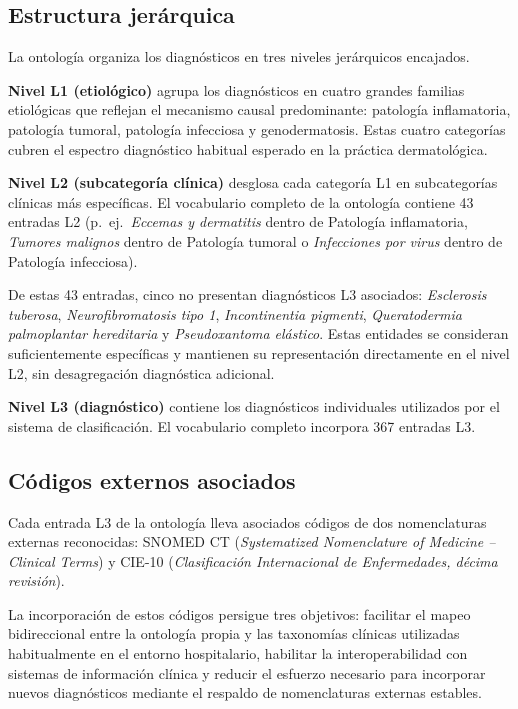 \subsection{Estructura jerárquica}
\label{sec:ontologia-estructura}

La ontología organiza los diagnósticos en tres niveles jerárquicos
encajados.

\textbf{Nivel L1 (etiológico)} agrupa los diagnósticos en cuatro
grandes familias etiológicas que reflejan el mecanismo causal
predominante: patología inflamatoria, patología tumoral, patología
infecciosa y genodermatosis. Estas cuatro categorías cubren el
espectro diagnóstico habitual esperado en la práctica dermatológica.

\textbf{Nivel L2 (subcategoría clínica)} desglosa cada categoría L1
en subcategorías clínicas más específicas. El vocabulario completo de
la ontología contiene 43 entradas L2 (p.~ej.~\emph{Eccemas y
dermatitis} dentro de Patología inflamatoria, \emph{Tumores
malignos} dentro de Patología tumoral o \emph{Infecciones por virus}
dentro de Patología infecciosa).

De estas 43 entradas, cinco no presentan diagnósticos L3 asociados:
\emph{Esclerosis tuberosa}, \emph{Neurofibromatosis tipo 1},
\emph{Incontinentia pigmenti}, \emph{Queratodermia palmoplantar
hereditaria} y \emph{Pseudoxantoma elástico}. Estas entidades se
consideran suficientemente específicas y mantienen su representación
directamente en el nivel L2, sin desagregación diagnóstica adicional.

\textbf{Nivel L3 (diagnóstico)} contiene los diagnósticos
individuales utilizados por el sistema de clasificación. El
vocabulario completo incorpora 367 entradas L3.

\subsection{Códigos externos asociados}
\label{sec:ontologia-codigos}

Cada entrada L3 de la ontología lleva asociados códigos de dos
nomenclaturas externas reconocidas: SNOMED CT
(\emph{Systematized Nomenclature of Medicine -- Clinical Terms}) y
CIE-10 (\emph{Clasificación Internacional de Enfermedades, décima
revisión}).

La incorporación de estos códigos persigue tres objetivos:
facilitar el mapeo bidireccional entre la ontología propia y las
taxonomías clínicas utilizadas habitualmente en el entorno
hospitalario, habilitar la interoperabilidad con sistemas de
información clínica y reducir el esfuerzo necesario para incorporar
nuevos diagnósticos mediante el respaldo de nomenclaturas externas
estables.

